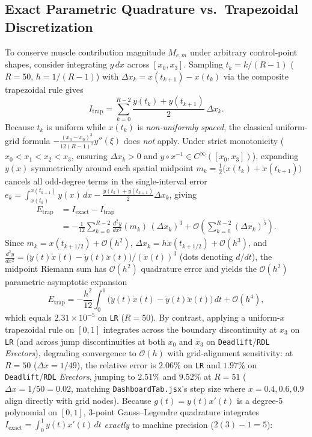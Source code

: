 \documentclass[10pt,twocolumn,letterpaper]{article}
\theoremstyle{plain}
\theoremstyle{definition}
\begin{document}
\subsection{Exact Parametric Quadrature vs.\ Trapezoidal Discretization}
To conserve muscle contribution magnitude $M_{e,m}$ under arbitrary control-point shapes, consider integrating $y\,dx$ across $[x_0, x_3]$. Sampling $t_k = k/(R-1)$ ($R = 50$, $h = 1/(R-1)$) with $\Delta x_k = x(t_{k+1}) - x(t_k)$ via the composite trapezoidal rule gives
\begin{equation}
  I_{\mathrm{trap}} = \sum_{k=0}^{R-2} \frac{y(t_k) + y(t_{k+1})}{2}\,\Delta x_k.
\end{equation}
Because $t_k$ is uniform while $x(t_k)$ is \emph{non-uniformly spaced}, the classical uniform-grid formula $-\frac{(x_3 - x_0)^3}{12(R-1)^2} y''(\xi)$ does \emph{not} apply. Under strict monotonicity ($x_0 < x_1 < x_2 < x_3$, ensuring $\Delta x_k > 0$ and $y \circ x^{-1} \in C^\infty([x_0, x_3])$), expanding $y(x)$ symmetrically around each spatial midpoint $m_k = \frac{1}{2}\bigl(x(t_k) + x(t_{k+1})\bigr)$ cancels all odd-degree terms in the single-interval error $e_k = \int_{x(t_k)}^{x(t_{k+1})} y(x)\,dx - \frac{y(t_k) + y(t_{k+1})}{2}\Delta x_k$, giving
\begin{equation}
\begin{aligned}
  E_{\mathrm{trap}} &= I_{\mathrm{exact}} - I_{\mathrm{trap}} \\
  &= -\frac{1}{12} \sum_{k=0}^{R-2} \frac{d^2y}{dx^2}(m_k)\,(\Delta x_k)^3 + \mathcal{O}\!\left(\sum_{k=0}^{R-2} (\Delta x_k)^5\right).
\end{aligned}
\end{equation}
Since $m_k = x(t_{k+1/2}) + \mathcal{O}(h^2)$, $\Delta x_k = h \dot{x}(t_{k+1/2}) + \mathcal{O}(h^3)$, and $\frac{d^2y}{dx^2} = \bigl(\ddot{y}(t)\dot{x}(t) - \dot{y}(t)\ddot{x}(t)\bigr)/(\dot{x}(t))^3$ (dots denoting $d/dt$), the midpoint Riemann sum has $\mathcal{O}(h^2)$ quadrature error and yields the $\mathcal{O}(h^2)$ parametric asymptotic expansion
\begin{equation}
  E_{\mathrm{trap}} = -\frac{h^2}{12} \int_0^1 \bigl(\ddot{y}(t)\dot{x}(t) - \dot{y}(t)\ddot{x}(t)\bigr)\,dt + \mathcal{O}(h^4),
\end{equation}
which equals $2.31 \times 10^{-5}$ on \texttt{LR} ($R=50$). By contrast, applying a uniform-$x$ trapezoidal rule on $[0, 1]$ integrates across the boundary discontinuity at $x_3$ on \texttt{LR} (and across jump discontinuities at both $x_0$ and $x_3$ on \texttt{Deadlift}/\texttt{RDL} \emph{Erectors}), degrading convergence to $\mathcal{O}(h)$ with grid-alignment sensitivity: at $R = 50$ ($\Delta x = 1/49$), the relative error is $2.06\%$ on \texttt{LR} and $1.97\%$ on \texttt{Deadlift}/\texttt{RDL} \emph{Erectors}, jumping to $2.51\%$ and $9.52\%$ at $R = 51$ ($\Delta x = 1/50 = 0.02$, matching \texttt{DashboardTab.jsx}'s step size where $x = 0.4, 0.6, 0.9$ align directly with grid nodes). Because $g(t) = y(t)x'(t)$ is a degree-5 polynomial on $[0, 1]$, 3-point Gauss--Legendre quadrature integrates $I_{\mathrm{exact}} = \int_0^1 y(t)x'(t)\,dt$ \emph{exactly} to machine precision ($2(3)-1 = 5$):
\end{document}
